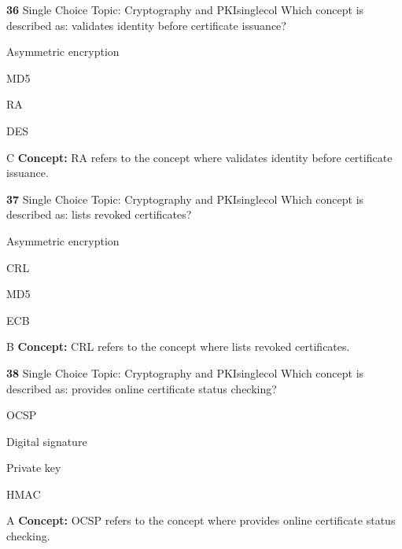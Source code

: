 \documentclass[10pt,a4paper]{article}
\begin{document}
\begin{qcard}{\color{white}\textbf{36} \hfill \small Single Choice \textbar{} Topic: Cryptography and PKI}{singlecol}
Which concept is described as: validates identity before certificate issuance?

\begin{qoptions}
\item Asymmetric encryption
\item MD5
\item RA
\item DES
\end{qoptions}
\begin{explainbox}{C}
\textbf{Concept:} RA refers to the concept where validates identity before certificate issuance.
\end{explainbox}
\end{qcard}

\begin{qcard}{\color{white}\textbf{37} \hfill \small Single Choice \textbar{} Topic: Cryptography and PKI}{singlecol}
Which concept is described as: lists revoked certificates?

\begin{qoptions}
\item Asymmetric encryption
\item CRL
\item MD5
\item ECB
\end{qoptions}
\begin{explainbox}{B}
\textbf{Concept:} CRL refers to the concept where lists revoked certificates.
\end{explainbox}
\end{qcard}

\begin{qcard}{\color{white}\textbf{38} \hfill \small Single Choice \textbar{} Topic: Cryptography and PKI}{singlecol}
Which concept is described as: provides online certificate status checking?

\begin{qoptions}
\item OCSP
\item Digital signature
\item Private key
\item HMAC
\end{qoptions}
\begin{explainbox}{A}
\textbf{Concept:} OCSP refers to the concept where provides online certificate status checking.
\end{explainbox}
\end{qcard}
\end{document}
